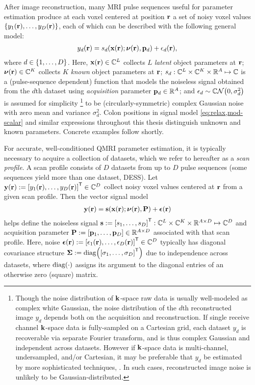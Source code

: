 After image reconstruction,
many MRI pulse sequences
useful for parameter estimation
produce at each voxel 
centered at position $\mathbf{r}$
a set of noisy voxel values 
$\set{y_1\pr,\dots,y_D\pr}$, 
each of which can be described
with the following general model:
\begin{align}
	y_d\pr = s_d\paren{\bmx\pr; \bmnu\pr, \bmp_d} + \epsilon_d\pr,
	\label{eq:relax,mod-scalar}
\end{align}
where 
$d \in \set{1,\dots,D}$. 
Here,
$\bmx\pr \in \complexes{L}$ 
collects $L$ \emph{latent} object parameters at $\mathbf{r}$;
$\bmnu\pr \in \complexes{K}$ 
collects $K$ \emph{known} object parameters at $\mathbf{r}$;
$s_d : \mathbb{C}^{L} \times \mathbb{C}^{K} \times \mathbb{R}^{A} \mapsto \mathbb{C}$
is a (pulse-sequence dependent) function
that models the noiseless signal 
obtained from the $d$th dataset
using \emph{acquisition} parameter $\mathbf{p}_d \in \mathbb{R}^{A}$;
and $\epsilon_d \sim \cgauss{0}{\sigma_d^2}$ 
is assumed for simplicity 
\footnote{Though the noise distribution 
of $\mathbf{k}$-space raw data 
is usually well-modeled
as complex white Gaussian, 
the noise distribution 
of the $d$th reconstructed image $y_d$ depends both
on the acquisition and reconstruction.
If single receive channel $\mathbf{k}$-space data
is fully-sampled
on a Cartesian grid,
each dataset $y_d$ is recoverable
via separate Fourier transform,
and is thus complex Gaussian
and independent across datasets.
However if $\mathbf{k}$-space data
is multi-channel, undersampled, and/or Cartesian,
it may be preferable
that $y_d$ be estimated by more sophisticated techniques,
\eg \cite{fessler:03:nff, muckley:15:fpm}.
In such cases,
reconstructed image noise is unlikely
to be Gaussian-distributed.
}
to be (circularly-symmetric) complex Gaussian noise
\cite{macovski:96:nim, lei:07:som}
with zero mean and variance $\sigma_d^2$.
Colon positions 
in signal model \eqref{eq:relax,mod-scalar} 
and similar expressions throughout this thesis 
distinguish unknown and known parameters.
Concrete examples follow shortly.

For accurate, well-conditioned QMRI parameter estimation,
it is typically necessary 
to acquire a collection of datasets,
which we refer to hereafter as a \emph{scan profile}.
A scan profile consists 
of $D$ datasets
from up to $D$ pulse sequences
(some sequences yield more than one dataset, \eg DESS).
Let 
$\bmy\pr := \brac{y_1\pr, \dots, y_D\pr}\tpose \in \complexes{D}$
collect noisy voxel values centered at $\mathbf{r}$
from a given scan profile.
Then the vector signal model
\begin{align}
	\bmy\pr = \bms\paren{\bmx\pr; \bmnu\pr, \bmP} + \bmeps\pr
	\label{eq:relax,mod-vec}
\end{align}
helps define the noiseless signal 
$\bms := \brac{s_1, \dots, s_D}\tpose
: \complexes{L} \times \complexes{K} \times \reals{A \times D} \mapsto \complexes{D}$
and acquisition parameter
$\bmP := \brac{\bmp_1,\dots,\bmp_D} \in \reals{A \times D}$
associated with that scan profile.
Here, noise
$\bmeps\pr := \brac{\epsilon_1\pr, \dots, \epsilon_D\pr}\tpose \in \complexes{D}$
typically has diagonal covariance structure
$\bmSig := \diag{\brac{\sigma_1,\dots,\sigma_D}\tpose}$
due to independence across datasets,
where $\diag{\cdot}$ assigns its argument 
to the diagonal entries 
of an otherwise zero (square) matrix.

